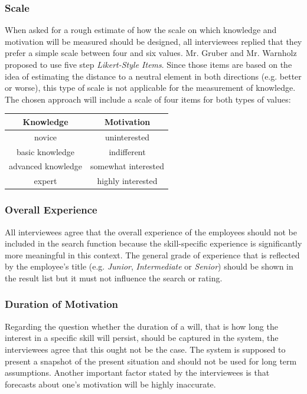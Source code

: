 \newpage

\subsubsection{Scale}
\label{scale_definition}
When asked for a rough estimate of how the scale on which knowledge and motivation will be measured should be designed, all interviewees replied that they prefer a simple scale between four and six values. Mr. Gruber and Mr. Warnholz proposed to use five step \textit{Likert-Style Items}. Since those items are based on the idea of estimating the distance to a neutral element in both directions (e.g. better or worse), this type of scale is not applicable for the measurement of knowledge. The chosen approach will include a scale of four items for both types of values:
\begin{center}
\begin{tabular}{c|c}
	Knowledge & Motivation \\
	\hline
	novice & uninterested\\
	basic knowledge & indifferent\\
	advanced knowledge & somewhat interested\\
	expert & highly interested\\
\end{tabular}
\end{center}


\subsubsection{Overall Experience}
All interviewees agree that the overall experience of the employees should not be included in the search function because the skill-specific experience is significantly more meaningful in this context. The general grade of experience that is reflected by the employee's title (e.g. \textit{Junior}, \textit{Intermediate} or \textit{Senior}) should be shown in the result list but it must not influence the search or rating.

\subsubsection{Duration of Motivation}
Regarding the question whether the duration of a will, that is how long the interest in a specific skill will persist, should be captured in the system, the interviewees agree that this ought not be the case. The system is supposed to present a snapshot of the present situation and should not be used for long term assumptions. Another important factor stated by the interviewees is that forecasts about one's motivation will be highly inaccurate.

